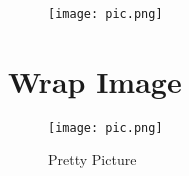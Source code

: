 \documentclass[a4paper,12pt]{book}
\begin{document}
\enlargethispage{\baselineskip}
 
 
\blindtext[2]
 
 
\blinditemize
\blindenumerate
\blinddescription
 
 
 
 
 
\newpage
 
\blindtext
 
 
 
 
\begin{figure}[ht]
\centering
 
 
 
 
\texttt{[image: pic.png]}
\end{figure}
\blindtext
 
\newpage
 
\section*{Wrap Image}
 
 
\begingroup
 
 
\setlength{\intextsep}{0pt}
 
 
\setlength{\columnsep}{15pt}
 
 
 
 
 
\begin{wrapfigure}{r}{0.45\textwidth}
\centering
 
  \texttt{[image: pic.png]}
  \caption{Pretty Picture}\label{fig:prettypic}
\end{wrapfigure}
 
\end{document}
